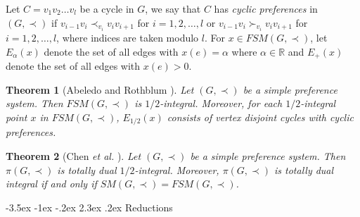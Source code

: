 \documentclass[11pt]{article}
\makeatletter
\newtheorem{theorem}{Theorem}%
\numberwithin{theorem}{section}
\renewcommand\section{%
  \@startsection{section}{1}
                {\z@}%
                {-3.5ex \@plus -1ex \@minus -.2ex}%
                {2.3ex \@plus.2ex}%
                {\large\bfseries}%
}
\makeatother
\begin{document}
Let $C=v_1 v_2 \ldots v_l$ be a cycle in $G$, we say that $C$ has \textit{cyclic preferences} in $(G,\prec)$ if
$v_{i-1} v_i \prec_{v_i} v_i v_{i+1}$ for $i=1,2,\ldots,l$
or $v_{i-1} v_i\succ_{v_i} v_i v_{i+1}$ for $i=1,2,\ldots,l$,
where indices are taken modulo $l$.
For $x\in FSM(G,\prec)$, let $E_{\alpha}(x)$ denote the set of all edges with $x(e)=\alpha$ where $\alpha\in\mathbb{R}$ and $E_+(x)$ denote the set of all edges with $x(e)>0$.

\begin{theorem}[Abeledo and Rothblum \cite{AbelRoth94}]
\label{thm:AbelRoth94}
Let $(G,\prec)$ be a simple preference system. Then $FSM(G,\prec)$ is $1/2$-integral. Moreover, for each $1/2$-integral point $x$ in $FSM(G,\prec)$, $E_{1/2}(x)$ consists of vertex disjoint cycles with cyclic preferences.
\end{theorem}

\begin{theorem}[Chen \textit{et al.} \cite{ChenDing12}]
\label{thm:ChenDing12}
Let $(G,\prec)$ be a simple preference system. Then $\pi(G,\prec)$ is totally dual $1/2$-integral. Moreover, $\pi(G,\prec)$ is totally dual integral if and only if $SM(G,\prec)=FSM(G,\prec)$.
\end{theorem}

\section{Reductions}
\end{document}
